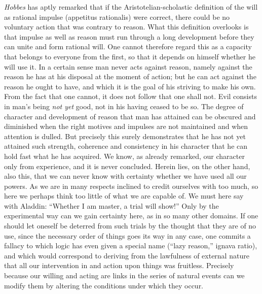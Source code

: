 \documentclass[12pt,a4paper,openany]{book}
\newcommand{\opage}[1]{\marginnote{\footnotesize\textit{[#1]}}}
\begin{document}
\emph{Hobbes} has aptly remarked that if the Aristotelian-scholastic
definition of the will as rational impulse (appetitus rationalis) were
correct, there could be no voluntary action that was contrary to reason.
What this definition overlooks is that impulse as well as reason must run
through a long development before they can unite and form rational will. One
cannot therefore regard this as a capacity that belongs to everyone from the
first, so that it depends on himself whether he will use it. In a certain
sense man never acts against reason, namely against the reason he has at his
disposal at the moment of action; but he can act against the reason he
\opage{142}ought to have, and which it is the goal of his striving to make
his own. From the fact that one cannot, it does not follow that one shall
not. Evil consists in man's being \emph{not yet} good, not in his having
ceased to be so. The degree of character and development of reason that man
has attained can be obscured and diminished when the right motives and
impulses are not maintained and when attention is dulled. But precisely this
surely demonstrates that he has not yet attained such strength, coherence
and consistency in his character that he can hold fast what he has acquired.
We know, as already remarked, our character only from experience, and it is
never concluded. Herein lies, on the other hand, also this, that we can
never know with certainty whether we have used all our powers. As we are in
many respects inclined to credit ourselves with too much, so here we perhaps
think too little of what we are capable of. We must here say with Aladdin:
``Whether I am master, a trial will show!'' Only by the experimental way can
we gain certainty here, as in so many other domains. If one should let
oneself be deterred from such trials by the thought that they are of no use,
since the necessary order of things goes its way in any case, one commits a
fallacy to which logic has even given a special name (``lazy reason,''
ignava ratio), and which would correspond to deriving from the lawfulness of
external nature that all our intervention in and action upon things was
fruitless. Precisely because our willing and acting are links in the series
of \opage{143}natural events can we modify them by altering the conditions
under which they occur.
\end{document}
